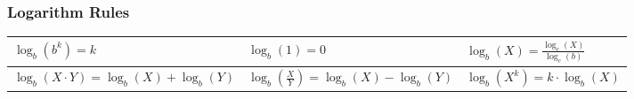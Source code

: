 \documentclass[twoside]{article}
\renewcommand{\arraystretch}{1.5} %
\begin{document}
\egroup
\vspace{1em}
\begin{multicols*}{2}
\end{multicols*}
{
\subsubsection*{Logarithm Rules}
}
\vspace{1em}
\bgroup
\def\arraystretch{2}
{\normalsize
\begin{center}
  \begin{tabular}{| >{\centering}m{5cm}| >{\centering}m{5cm}| >{\centering}m{5cm}|}
    \hline
    $\log_b(b^k) = k$
     &
    $\log_b(1) = 0$
     &
    $\log_b(X) = \frac{\log_c(X)}{\log_c(b)}$
    \tabularnewline \hline
    $\log_b(X \cdotp Y) = \log_b(X) + \log_b(Y)$
     &
    $\log_b(\frac{X}{Y}) = \log_b(X) - \log_b(Y)$
     &
    $\log_b(X^k) = k \cdotp \log_b(X)$
    \tabularnewline \hline
  \end{tabular}
\end{center}
}
\egroup
\vspace{1em}
\begin{multicols*}{2}
\end{multicols*}
\end{document}

